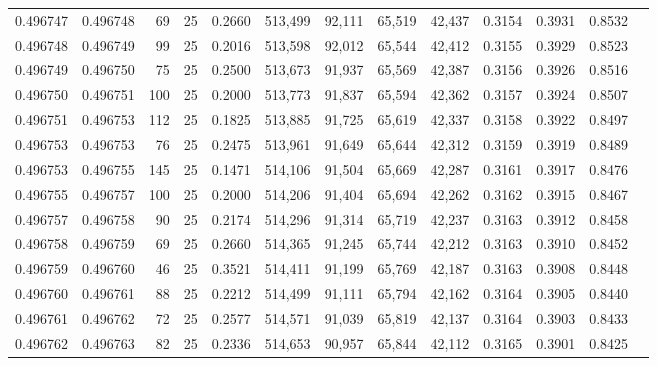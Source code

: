 \begin{tabular}{rrrrrrrrrrrrr}
0.496747 & 0.496748 &    69 &  25 &                                     0.2660 & 513,499 &  92,111 &  65,519 &  42,437 & 0.3154 & 0.3931 & 0.8532 \\
0.496748 & 0.496749 &    99 &  25 &                                     0.2016 & 513,598 &  92,012 &  65,544 &  42,412 & 0.3155 & 0.3929 & 0.8523 \\
0.496749 & 0.496750 &    75 &  25 &                                     0.2500 & 513,673 &  91,937 &  65,569 &  42,387 & 0.3156 & 0.3926 & 0.8516 \\
0.496750 & 0.496751 &   100 &  25 &                                     0.2000 & 513,773 &  91,837 &  65,594 &  42,362 & 0.3157 & 0.3924 & 0.8507 \\
0.496751 & 0.496753 &   112 &  25 &                                     0.1825 & 513,885 &  91,725 &  65,619 &  42,337 & 0.3158 & 0.3922 & 0.8497 \\
0.496753 & 0.496753 &    76 &  25 &                                     0.2475 & 513,961 &  91,649 &  65,644 &  42,312 & 0.3159 & 0.3919 & 0.8489 \\
0.496753 & 0.496755 &   145 &  25 &                                     0.1471 & 514,106 &  91,504 &  65,669 &  42,287 & 0.3161 & 0.3917 & 0.8476 \\
0.496755 & 0.496757 &   100 &  25 &                                     0.2000 & 514,206 &  91,404 &  65,694 &  42,262 & 0.3162 & 0.3915 & 0.8467 \\
0.496757 & 0.496758 &    90 &  25 &                                     0.2174 & 514,296 &  91,314 &  65,719 &  42,237 & 0.3163 & 0.3912 & 0.8458 \\
0.496758 & 0.496759 &    69 &  25 &                                     0.2660 & 514,365 &  91,245 &  65,744 &  42,212 & 0.3163 & 0.3910 & 0.8452 \\
0.496759 & 0.496760 &    46 &  25 &                                     0.3521 & 514,411 &  91,199 &  65,769 &  42,187 & 0.3163 & 0.3908 & 0.8448 \\
0.496760 & 0.496761 &    88 &  25 &                                     0.2212 & 514,499 &  91,111 &  65,794 &  42,162 & 0.3164 & 0.3905 & 0.8440 \\
0.496761 & 0.496762 &    72 &  25 &                                     0.2577 & 514,571 &  91,039 &  65,819 &  42,137 & 0.3164 & 0.3903 & 0.8433 \\
0.496762 & 0.496763 &    82 &  25 &                                     0.2336 & 514,653 &  90,957 &  65,844 &  42,112 & 0.3165 & 0.3901 & 0.8425 \\

\end{tabular}
